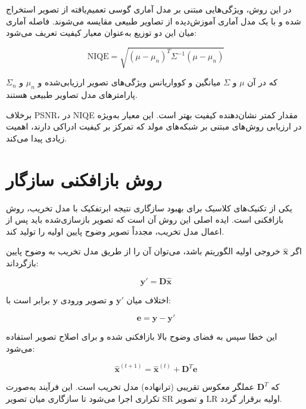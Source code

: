 در این روش، ویژگی‌هایی مبتنی بر مدل آماری گوسی تعمیم‌یافته از تصویر استخراج شده و با یک مدل آماری آموزش‌دیده از تصاویر طبیعی مقایسه می‌شوند. فاصله آماری میان این دو توزیع به‌عنوان معیار کیفیت تعریف می‌شود:

\begin{equation}
	\text{NIQE} =
	\sqrt{
		(\mu - \mu_n)^T
		\Sigma^{-1}
		(\mu - \mu_n)
	}
\end{equation}

که در آن $\mu$ و $\Sigma$ میانگین و کوواریانس ویژگی‌های تصویر ارزیابی‌شده و $\mu_n$ و $\Sigma_n$ پارامترهای مدل تصاویر طبیعی هستند.

برخلاف PSNR، در NIQE مقدار کمتر نشان‌دهنده کیفیت بهتر است. این معیار به‌ویژه در ارزیابی روش‌های مبتنی بر شبکه‌های مولد که تمرکز بر کیفیت ادراکی دارند، اهمیت زیادی پیدا می‌کند.

\section{روش بازافکنی سازگار}

یکی از تکنیک‌های کلاسیک برای بهبود سازگاری نتیجه ابرتفکیک با مدل تخریب، روش بازافکنی است. ایده اصلی این روش آن است که تصویر بازسازی‌شده باید پس از اعمال مدل تخریب، مجدداً تصویر وضوح پایین اولیه را تولید کند.

اگر $\hat{\mathbf{x}}$ خروجی اولیه الگوریتم باشد، می‌توان آن را از طریق مدل تخریب به وضوح پایین بازگرداند:

\begin{equation}
	\mathbf{y}' = \mathbf{D}\hat{\mathbf{x}}
\end{equation}

اختلاف میان $\mathbf{y}'$ و تصویر ورودی $\mathbf{y}$ برابر است با:

\begin{equation}
	\mathbf{e} = \mathbf{y} - \mathbf{y}'
\end{equation}

این خطا سپس به فضای وضوح بالا بازافکنی شده و برای اصلاح تصویر استفاده می‌شود:

\begin{equation}
	\hat{\mathbf{x}}^{(t+1)} =
	\hat{\mathbf{x}}^{(t)}
	+
	\mathbf{D}^T \mathbf{e}
\end{equation}

که $\mathbf{D}^T$ عملگر معکوس تقریبی (ترانهاده) مدل تخریب است. این فرآیند به‌صورت تکراری اجرا می‌شود تا سازگاری میان تصویر SR و تصویر LR اولیه برقرار گردد.

